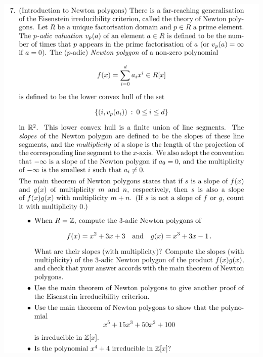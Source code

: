 \documentclass[12pt,letterpaper,boxed]{hmcpset}
\begin{document}
\begin{problem}
	\includegraphics[scale=0.8]{7.png}
	\hfill
\end{problem}
\end{document}
